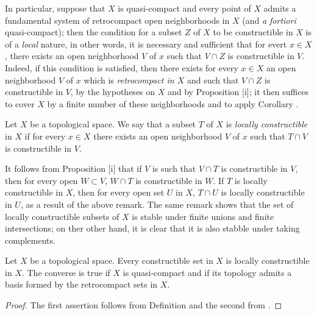 \begin{env}[9.1.10]
\label{0.9.1.10}
In particular, suppose that $X$ is quasi-compact and every point
of $X$ admits a fundamental system of retrocompact open neighborhoods in $X$ (and \emph{a fortiori} quasi-compact); then the condition for a subset $Z$ of $X$ to be constructible in $X$ is of a \emph{local} nature, in other words, it is necessary and sufficient that for evert $x\in X$, there exists an open neighborhood $V$ of $x$ such that $V\cap Z$ is constructible in $V$.
Indeed, if this condition is satisfied, then there exists for every $x\in X$ an open neighborhood $V$ of $x$ which is \emph{retrocompact in $X$} and such that $V\cap Z$ is constructible in $V$, by the hypotheses on $X$ and by Proposition [i]; it then suffices to cover $X$ by a finite number of these neighborhoods and to apply Corollary .
\end{env}

\begin{definition}[9.1.11]
\label{0.9.1.11}
Let $X$ be a topological space.
We say that a subset $T$ of $X$ is \emph{locally constructible} in $X$ if for every $x\in X$ there exists an open neighborhood $V$ of $x$ such that $T\cap V$ is constructible in $V$.
\end{definition}

It follows from Proposition [i] that if $V$ is such that $V\cap T$ is constructible in $V$, then for every open $W\subset V$, $W\cap T$ is constructible in $W$.
If $T$ is locally constructible in $X$, then for every open set $U$ in $X$, $T\cap U$ is locally constructible in $U$, as a result of the above remark.
The same remark shows that the set of locally constructible subsets of $X$ is stable under finite unions and finite intersections; on ther other hand, it is clear that it is also stabble under taking complements.

\begin{proposition}[9.1.12]
\label{0.9.1.12}
Let $X$ be a topological space.
Every constructible set in $X$ is locally constructible in $X$.
The converse is true if $X$ is quasi-compact and if its topology admits a basis formed by the retrocompact sets in $X$.
\end{proposition}

\begin{proof}
The first assertion follows from Definition  and the second from .
\end{proof}

